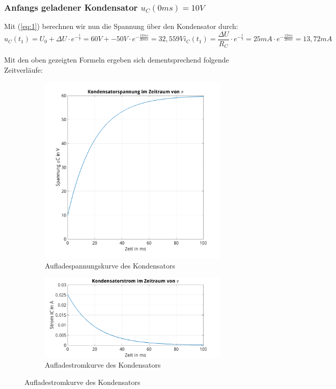 \documentclass{article}
\begin{document}
\subsubsection{Anfangs geladener Kondensator $u_{C}(0ms) = 10V$}

Mit (\ref{eq:1}) berechnen wir nun die Spannung über den Kondensator durch:
\begin{equation*}
  u_{C}(t_{1}) = U_{0}+\Delta U \cdot e^{-\frac{t}{\tau}} = 60V + -50V \cdot e^{-\frac{12ms}{20ms}} = 32,559V
  i_{C}(t_{1}) = \frac{\Delta U}{R_{C}} \cdot e^{-\frac{t}{\tau}} = 25mA \cdot e^{-\frac{12ms}{20ms}} = 13,72mA
\end{equation*}

Mit den oben gezeigten Formeln ergeben sich dementsprechend folgende Zeitverläufe:

\begin{figure}[h]
\centering
    \begin{subfigure}[b]{0.4\textwidth}
    \centering
    \includegraphics[width=\textwidth]{../assets/images/ET2P5/Kondensatorspannung12.png}
    \caption{Aufladespannungskurve des Kondensators}
  \end{subfigure}
  \hfill
  \begin{subfigure}[b]{0.4\textwidth}
    \centering
    \includegraphics[width=\textwidth]{../assets/images/ET2P5/Kondensatorstrom12.png}
    \caption{Aufladestromkurve des Kondensators}
  \end{subfigure}


\end{figure}
\end{document}
